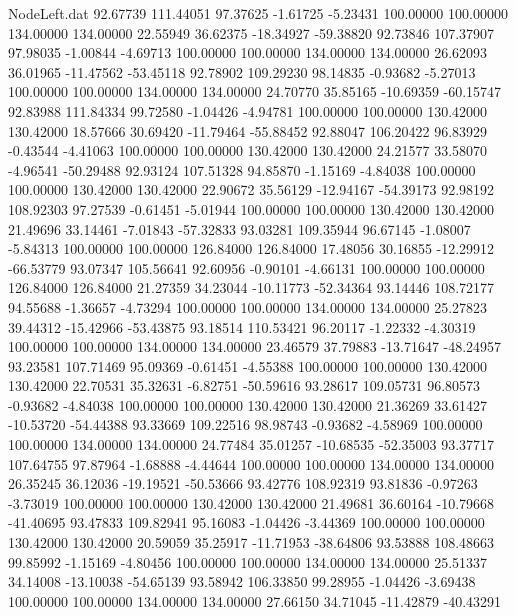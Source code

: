 \begin{filecontents}{NodeLeft.dat}
  92.67739  111.44051   97.37625    -1.61725   -5.23431  100.00000  100.00000  134.00000  134.00000   22.55949   36.62375  -18.34927  -59.38820
  92.73846  107.37907   97.98035    -1.00844   -4.69713  100.00000  100.00000  134.00000  134.00000   26.62093   36.01965  -11.47562  -53.45118
  92.78902  109.29230   98.14835    -0.93682   -5.27013  100.00000  100.00000  134.00000  134.00000   24.70770   35.85165  -10.69359  -60.15747
  92.83988  111.84334   99.72580    -1.04426   -4.94781  100.00000  100.00000  130.42000  130.42000   18.57666   30.69420  -11.79464  -55.88452
  92.88047  106.20422   96.83929    -0.43544   -4.41063  100.00000  100.00000  130.42000  130.42000   24.21577   33.58070   -4.96541  -50.29488
  92.93124  107.51328   94.85870    -1.15169   -4.84038  100.00000  100.00000  130.42000  130.42000   22.90672   35.56129  -12.94167  -54.39173
  92.98192  108.92303   97.27539    -0.61451   -5.01944  100.00000  100.00000  130.42000  130.42000   21.49696   33.14461   -7.01843  -57.32833
  93.03281  109.35944   96.67145    -1.08007   -5.84313  100.00000  100.00000  126.84000  126.84000   17.48056   30.16855  -12.29912  -66.53779
  93.07347  105.56641   92.60956    -0.90101   -4.66131  100.00000  100.00000  126.84000  126.84000   21.27359   34.23044  -10.11773  -52.34364
  93.14446  108.72177   94.55688    -1.36657   -4.73294  100.00000  100.00000  134.00000  134.00000   25.27823   39.44312  -15.42966  -53.43875
  93.18514  110.53421   96.20117    -1.22332   -4.30319  100.00000  100.00000  134.00000  134.00000   23.46579   37.79883  -13.71647  -48.24957
  93.23581  107.71469   95.09369    -0.61451   -4.55388  100.00000  100.00000  130.42000  130.42000   22.70531   35.32631   -6.82751  -50.59616
  93.28617  109.05731   96.80573    -0.93682   -4.84038  100.00000  100.00000  130.42000  130.42000   21.36269   33.61427  -10.53720  -54.44388
  93.33669  109.22516   98.98743    -0.93682   -4.58969  100.00000  100.00000  134.00000  134.00000   24.77484   35.01257  -10.68535  -52.35003
  93.37717  107.64755   97.87964    -1.68888   -4.44644  100.00000  100.00000  134.00000  134.00000   26.35245   36.12036  -19.19521  -50.53666
  93.42776  108.92319   93.81836    -0.97263   -3.73019  100.00000  100.00000  130.42000  130.42000   21.49681   36.60164  -10.79668  -41.40695
  93.47833  109.82941   95.16083    -1.04426   -3.44369  100.00000  100.00000  130.42000  130.42000   20.59059   35.25917  -11.71953  -38.64806
  93.53888  108.48663   99.85992    -1.15169   -4.80456  100.00000  100.00000  134.00000  134.00000   25.51337   34.14008  -13.10038  -54.65139
  93.58942  106.33850   99.28955    -1.04426   -3.69438  100.00000  100.00000  134.00000  134.00000   27.66150   34.71045  -11.42879  -40.43291

\end{filecontents}
